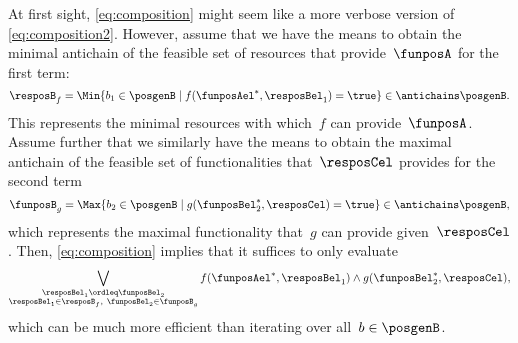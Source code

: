 \begin{remark}
  At first sight, \cref{eq:composition} might seem like a more verbose version of \cref{eq:composition2}. However, assume that we have the means to obtain the minimal antichain of the feasible set of resources that provide~$\funposA$ for the first term:
  \begin{equation*}
    \resposB_f = \Min \{b_1\in \posgenB \mid f(\funposAel^*,\resposBel_1)=\true\} \in \antichains \posgenB.
  \end{equation*}
  This represents the minimal resources with which~$f$ can provide~$\funposA$. Assume further that we similarly have the means to obtain the maximal antichain of the feasible set of functionalities that~$\resposCel$ provides for the second term
  \begin{equation*}
    \funposB_g = \Max \{b_2\in \posgenB \mid g(\funposBel_2^*,\resposCel)=\true\} \in \antichains \posgenB,
  \end{equation*}
  which represents the maximal functionality that~$g$ can provide given~$\resposCel$. Then, \cref{eq:composition} implies that it suffices to only evaluate
  \begin{equation*}
    \bigvee_{\substack{\resposBel_1\ordleq\funposBel_2 \\ \resposBel_1\in \resposB_f,~ \funposBel_2\in\funposB_g }} f(\funposAel^*,\resposBel_1) \wedge g(\funposBel_2^*,\resposCel),
  \end{equation*}
  which can be much more efficient than iterating over all~$b\in \posgenB$.
\end{remark}

